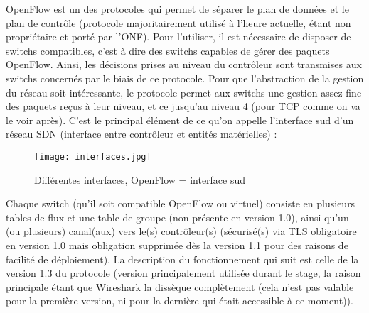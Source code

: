 OpenFlow est un des protocoles qui permet de séparer le plan de données et le plan de contrôle (protocole majoritairement utilisé à l'heure actuelle, étant non propriétaire et porté par l'ONF). Pour l'utiliser, il est nécessaire de disposer de switchs compatibles, c'est à dire des switchs capables de gérer des paquets OpenFlow. Ainsi, les décisions prises au niveau du contrôleur sont transmises aux switchs concernés par le biais de ce protocole. Pour que l'abstraction de la gestion du réseau soit intéressante, le protocole permet aux switchs une gestion assez fine des paquets reçus à leur niveau, et ce jusqu'au niveau 4 (pour TCP comme on va le voir après). C'est le principal élément de ce qu'on appelle l'interface sud d'un réseau SDN (interface entre contrôleur et entités matérielles) :
\begin{figure}[h]
  	\centering
  	\texttt{[image: interfaces.jpg]}
  	\caption{Différentes interfaces, OpenFlow = interface sud}
\end{figure}

Chaque switch (qu'il soit compatible OpenFlow ou virtuel) consiste en plusieurs tables de flux et une table de groupe (non présente en version 1.0), ainsi qu'un (ou plusieurs) canal(aux) vers le(s) contrôleur(s) (sécurisé(s) via TLS obligatoire en version 1.0 mais obligation supprimée dès la version 1.1 pour des raisons de facilité de déploiement). La description du fonctionnement qui suit est celle de la version 1.3 du protocole (version principalement utilisée durant le stage, la raison principale étant que Wireshark la dissèque complètement (cela n'est pas valable pour la première version, ni pour la dernière qui était accessible à ce moment)).\\

